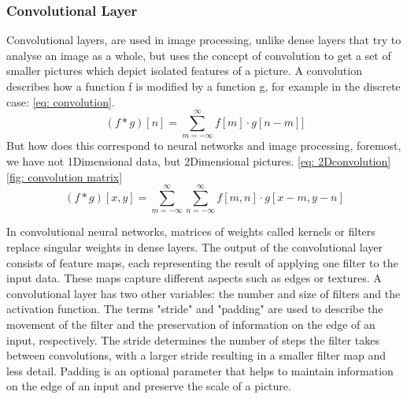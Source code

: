 \subsubsection{Convolutional Layer}
Convolutional layers, are used in image processing\cite{lecun_backpropagation_1989,szegedy_going_2014,krizhevsky_imagenet_2012}, unlike dense layers that try to analyse an image as a whole, but uses the concept of convolution to get a set of smaller pictures which depict isolated features of a picture.
A convolution describes how a function f is modified by a function g, for example in the discrete case: \ref{eq: convolution}.
\begin{equation}
(f \ast g)[n]
    = \sum_{m=-\infty}^{\infty}f[m]\cdot g[n - m]
    \label{eq: convolution}]
\end{equation}
But how does this correspond to neural networks and image processing, foremost, we have not 1Dimensional data, but 2Dimensional pictures. \ref{eq: 2Dconvolution} \ref{fig: convolution matrix}
\begin{equation}
(f \ast g)[x,y]
    = \sum^{\infty}_{m=-\infty} \sum^{\infty}_{n=-\infty} f[m,n]\cdot g[x-m,y-n]
    \label{eq: 2Dconvolution}
\end{equation}

In convolutional neural networks, matrices of weights called kernels or filters replace singular weights in dense layers.
The output of the convolutional layer consists of feature maps, each representing the result of applying one filter to the input data.
These maps capture different aspects such as edges or textures.
A convolutional layer has two other variables: the number and size of filters and the activation function.
The terms "stride" and "padding" are used to describe the movement of the filter and the preservation of information on the edge of an input, respectively.
The stride determines the number of steps the filter takes between convolutions, with a larger stride resulting in a smaller filter map and less detail.
Padding is an optional parameter that helps to maintain information on the edge of an input and preserve the scale of a picture.

